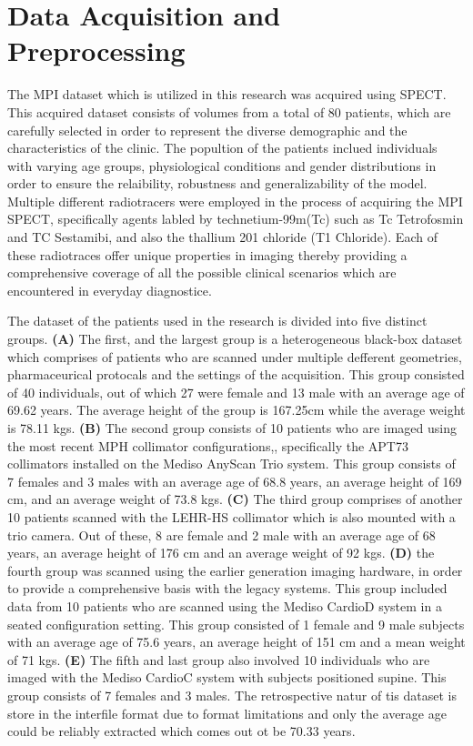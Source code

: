 \section{Data Acquisition and Preprocessing}

The MPI dataset which is utilized in this research was acquired using SPECT. This acquired dataset consists of volumes from a total of 80 patients, which are carefully selected in order to represent the diverse demographic and the characteristics of the clinic. The popultion of the patients inclued individuals with varying age groups, physiological conditions and gender distributions in order to ensure the relaibility, robustness and generalizability of the model. Multiple different radiotracers were employed in the process of acquiring the MPI SPECT, specifically agents labled by technetium-99m(Tc) such as Tc Tetrofosmin and TC Sestamibi, and also the thallium 201 chloride (T1 Chloride). Each of these radiotraces offer unique properties in imaging thereby providing a comprehensive coverage of all the possible clinical scenarios which are encountered in everyday diagnostice. 

The dataset of the patients used in the research is divided into five distinct groups. \textbf{(A)} The first, and the largest group is a heterogeneous black-box dataset which comprises of patients who are scanned under multiple defferent geometries, pharmaceurical protocals and the settings of the acquisition. This group consisted of 40 individuals, out of which 27 were female and 13 male with an average age of 69.62 years. The average height of the group is 167.25cm while the average weight is 78.11 kgs. \textbf{(B)} The second group consists of 10 patients who are imaged using the most recent MPH collimator configurations,, specifically the APT73 collimators installed on the Mediso AnyScan Trio system. This group consists of 7 females and 3 males with an average age of 68.8 years, an average height of 169 cm, and an average weight of 73.8 kgs. \textbf{(C)} The third group comprises of another 10 patients scanned with the LEHR-HS collimator which is also mounted with a trio camera. Out of these, 8 are female and 2 male with an average age of 68 years, an average height of 176 cm and an average weight of 92 kgs. \textbf{(D)} the fourth group was scanned using the earlier generation imaging hardware, in order to provide a comprehensive basis with the legacy systems. This group included data from 10 patients who are scanned using the Mediso CardioD system in a seated configuration setting. This group consisted of 1 female and 9 male subjects with an average age of 75.6 years, an average height of 151 cm and a mean weight of 71 kgs. \textbf{(E)} The fifth and last group also involved 10 individuals who are imaged with the Mediso CardioC system with subjects positioned supine. This group consists of 7 females and 3 males. The retrospective natur of tis dataset is store in the interfile format due to format limitations and only the average age could be reliably extracted which comes out ot be 70.33 years.

